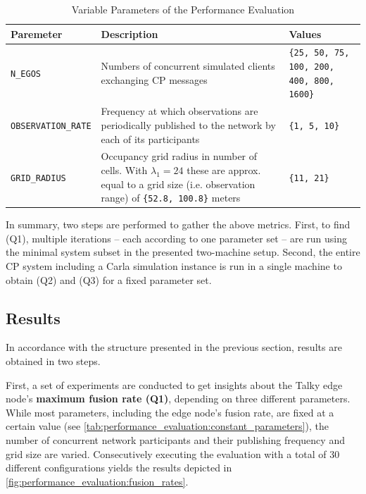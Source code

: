 \begin{table}
	\centering
	\begin{tabular}{|p{3.5cm}|p{8.5cm}|p{3.2cm}|}
		\hline 
		\textbf{Paremeter} & \textbf{Description} & \textbf{Values} \\ 
		\hline 
		\texttt{N\_EGOS} & Numbers of concurrent simulated clients exchanging CP messages & \texttt{\{25, 50, 75, 100, 200, 400, 800, 1600\}} \\ 
		\hline 
		\texttt{OBSERVATION\_RATE} & Frequency at which observations are periodically published to the network by each of its participants & \texttt{\{1, 5, 10\}} \\ 
		\hline 
		\texttt{GRID\_RADIUS} & Occupancy grid radius in number of cells. With $\lambda_1 = 24$ these are approx. equal to a grid size (i.e. observation range) of \texttt{\{52.8, 100.8\}} meters & \texttt{\{11, 21\}} \\ 
		\hline 
	\end{tabular}
	\caption{Variable Parameters of the Performance Evaluation}
	\label{tab:performance_evaluation:variable_parameters}
\end{table}

In summary, two steps are performed to gather the above metrics. First, to find (Q1), multiple iterations – each according to one parameter set – are run using the minimal system subset in the presented two-machine setup. Second, the entire CP system including a Carla simulation instance is run in a single machine to obtain (Q2) and (Q3) for a fixed parameter set. 

\subsection{Results}
\label{subsec:evaluation:performance_evaluation:results}
In accordance with the structure presented in the previous section, results are obtained in two steps.
\par
\bigskip

First, a set of experiments are conducted to get insights about the Talky edge node's \textbf{maximum fusion rate (Q1)}, depending on three different parameters. While most parameters, including the edge node's fusion rate, are fixed at a certain value (see \cref{tab:performance_evaluation:constant_parameters}), the number of concurrent network participants and their publishing frequency and grid size are varied. Consecutively executing the evaluation with a total of 30 different configurations yields the results depicted in \cref{fig:performance_evaluation:fusion_rates}.

